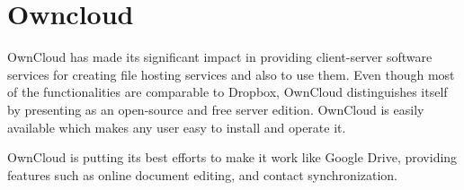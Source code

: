 \section{Owncloud}

OwnCloud has made its significant impact in providing client-server software
services for creating file hosting services and also to use them. Even though
most of the functionalities are comparable to Dropbox, OwnCloud distinguishes
itself by presenting as an open-source and free server edition. OwnCloud is
easily available which makes any user easy to install and operate it.

OwnCloud is putting its best efforts to make it work like Google Drive,
providing features such as online document editing, and contact
synchronization.~\cite{Owncloud}
